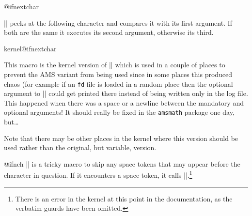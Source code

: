 \begin{docCommand}{@ifnextchar}{}

  |\@ifnextchar| peeks at the following character and compares it
  with its first argument. If both are the same it executes its
  second argument, otherwise its third.
\begin{teX}
\long{}
\end{teX}
\end{docCommand}

\begin{docCommand}{kernel@ifnextchar}{}

    This macro is the kernel version of |\@ifnextchar| which is used
    in a couple of places to prevent the AMS variant from being used
    since in some places this produced chaos (for example
    if an \texttt{fd} file
    is loaded in a random place then the optional argument to
    |\ProvidesFile| could get printed there instead of being written
    only in the log file.  This happened
    when there was a space or a newline between the mandatory and
    optional arguments! It should really be fixed in the
    \texttt{amsmath} package one day, but\ldots

    Note that there may be other places in the kernel where this version
    should be used rather than the original, but variable, version.

\begin{teX}
\let\kernel@ifnextchar\@ifnextchar
\end{teX}
\end{docCommand}
%
%
\begin{docCommand}{@ifnch}{}
    |\@ifnch| is a tricky macro to skip any space tokens that may
    appear before the character in question. If it encounters a space
    token, it calls |\@xifnch|.\footnote{There is an error in the kernel at this point in the documentation, as the
    verbatim guards have been omitted.}

\begin{teX}
\def\@ifnch{%
  \ifx\@let@token\@sptoken
    \let\reserved@c\@xifnch
  \else
    \ifx\@let@token\reserved@d
      \let\reserved@c\reserved@a
    \else
      \let\reserved@c\reserved@b
    \fi
  \fi
  \reserved@c}
\end{teX}
\end{docCommand}
%
